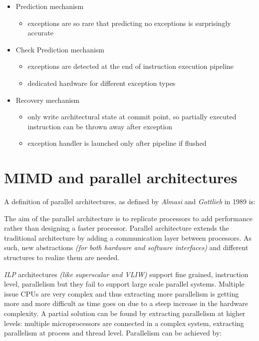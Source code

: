 \documentclass[english]{article}
\begin{document}
\begin{itemize}
  \item Prediction mechanism
        \begin{itemize}[label=\(\rightarrow\)]
          \item exceptions are so rare that predicting no exceptions is surprisingly accurate
        \end{itemize}
  \item Check Prediction mechanism
        \begin{itemize}[label=\(\rightarrow\)]
          \item exceptions are detected at the end of instruction execution pipeline
          \item dedicated hardware for different exception types
        \end{itemize}
  \item Recovery mechanism
        \begin{itemize}[label=\(\rightarrow\)]
          \item only write architectural state at commit point, so partially executed instruction can be thrown away after exception
          \item exception handler is launched only after pipeline if flushed
        \end{itemize}
\end{itemize}

\section{MIMD and parallel architectures}
\label{sec:mimd}

A definition of parallel architectures, as defined by \textit{Almasi} and \textit{Gottlieb} in 1989 is:


The aim of the parallel architecture is to replicate processors to add performance rather than designing a faster processor.
Parallel architecture extends the traditional architecture by adding a communication layer between processors.
As such, new abstractions \textit{(for both hardware and software interfaces)} and different structures to realize them are needed.

\bigskip
\textit{ILP} architectures \textit{(like superscalar and VLIW)} support fine grained, instruction level, parallelism but they fail to support large scale parallel systems.
Multiple issue CPUs are very complex and thus extracting more parallelism is getting more and more difficult as time goes on due to a steep increase in the hardware complexity.
A partial solution can be found by extracting parallelism at higher levels: multiple microprocessors are connected in a complex system, extracting parallelism at process and thread level.
Parallelism can be achieved by:
\end{document}
